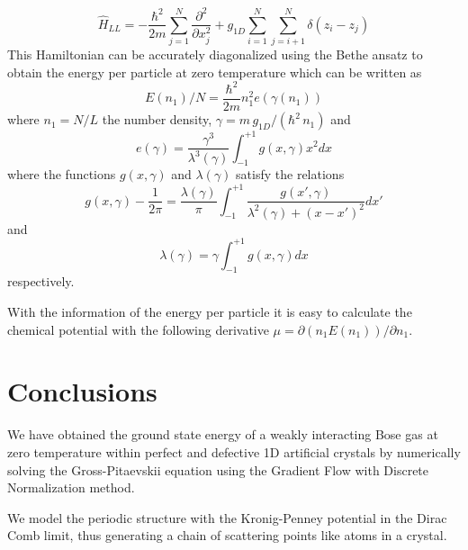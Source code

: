 \documentclass[twocolumn,showpacs,showkeys,preprintnumbers,superscriptaddress, pra, 10pt, aps]{revtex4-2}
\begin{document}
\begin{equation}
  {\hat{H}}_{LL} = - \frac{\hbar^2}{2m} \sum_{j=1}^{N} \frac{\partial^2}{\partial x^2_{j}} + g_{1D} \sum_{i=1}^{N} \sum_{j=i+1}^{N} \delta(z_i-z_j)
  \label{eq:Hamilton_Lieb}
\end{equation}
This Hamiltonian can be accurately diagonalized using the Bethe ansatz to obtain the energy per particle at zero temperature which can be written as
%
\begin{equation}
  E(n_1)/N = \frac{\hbar^2}{2m} n_1^2 e(\gamma(n_1))
  \label{eq:Energia_Lieb}
\end{equation}
%
where
%
$n_1=N/L$ the number density, $ \gamma = {m \, g_{1D}}/({\hbar^2 \, n_1})$
%
and
%
\begin{equation}
  e(\gamma) = \frac{\gamma^3}{\lambda^3(\gamma)} \int^{+1}_{-1} g(x, \gamma) x^2dx
  \label{eq:GammaInt}
\end{equation}
%
where the functions  $g(x, \gamma) $ and $\lambda(\gamma)$  satisfy the relations
%
\begin{equation}
  g(x, \gamma) - \frac{1}{2\pi} = \frac{\lambda(\gamma)}{\pi} \int^{+1}_{-1} \frac{g(x', \gamma)}{\lambda ^2 (\gamma)+ (x-x')^2}dx'
\end{equation}
%
and
\begin{equation}
  \lambda (\gamma) = \gamma \int^{+1}_{-1} g (x, \gamma) dx
\end{equation}
%
respectively.

With the information of the energy per particle it is easy to calculate the chemical potential with
the following derivative $\mu = \partial(n_1 E(n_1))/\partial n_1$.
%


\section{Conclusions}
We have obtained the ground state energy of a weakly interacting Bose gas at zero temperature
within perfect and defective 1D artificial crystals by numerically solving the Gross-Pitaevskii equation
using the Gradient Flow with Discrete Normalization method.

We model the periodic structure with the Kronig-Penney potential in the Dirac Comb limit, thus generating a chain of scattering points like atoms in a crystal.
\end{document}
